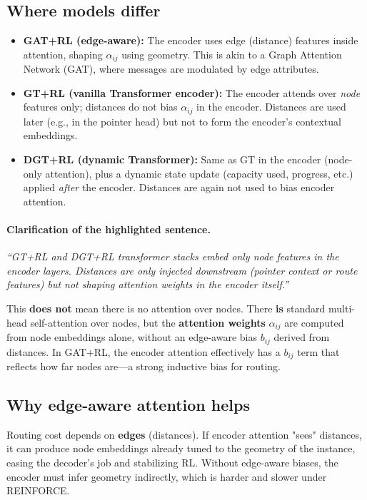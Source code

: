 \documentclass[11pt,a4paper]{article}
\begin{document}
\subsection{Where models differ}
\begin{itemize}[leftmargin=*]
  \item \textbf{GAT+RL (edge-aware):} The encoder uses edge (distance) features inside attention, shaping $\alpha_{ij}$ using geometry. This is akin to a Graph Attention Network (GAT), where messages are modulated by edge attributes.
  \item \textbf{GT+RL (vanilla Transformer encoder):} The encoder attends over \emph{node} features only; distances do not bias $\alpha_{ij}$ in the encoder. Distances are used later (e.g., in the pointer head) but not to form the encoder's contextual embeddings.
  \item \textbf{DGT+RL (dynamic Transformer):} Same as GT in the encoder (node-only attention), plus a dynamic state update (capacity used, progress, etc.) applied \emph{after} the encoder. Distances are again not used to bias encoder attention.
\end{itemize}

\paragraph{Clarification of the highlighted sentence.}
\emph{“GT+RL and DGT+RL transformer stacks embed only node features in the encoder layers. Distances are only injected downstream (pointer context or route features) but not shaping attention weights in the encoder itself.”}

This \textbf{does not} mean there is no attention over nodes. There \textbf{is} standard multi-head self-attention over nodes, but the \textbf{attention weights} $\alpha_{ij}$ are computed from node embeddings alone, without an edge-aware bias $b_{ij}$ derived from distances. In GAT+RL, the encoder attention effectively has a $b_{ij}$ term that reflects how far nodes are---a strong inductive bias for routing.

\subsection*{Why edge-aware attention helps}
Routing cost depends on \textbf{edges} (distances). If encoder attention "sees" distances, it can produce node embeddings already tuned to the geometry of the instance, easing the decoder's job and stabilizing RL. Without edge-aware biases, the encoder must infer geometry indirectly, which is harder and slower under REINFORCE.
\end{document}
